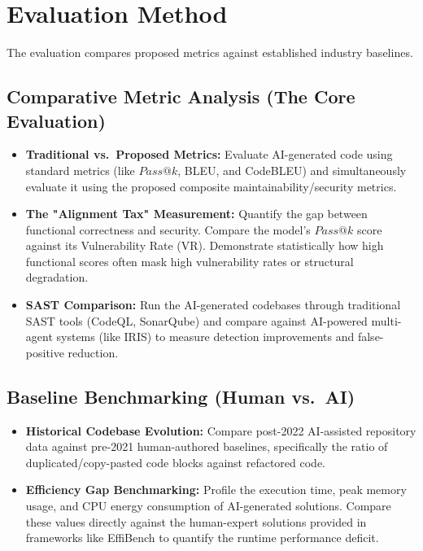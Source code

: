 \section{Evaluation Method}
The evaluation compares proposed metrics against established industry baselines.

\subsection{Comparative Metric Analysis (The Core Evaluation)}
\begin{itemize}
    \item \textbf{Traditional vs.\ Proposed Metrics:} Evaluate AI-generated code using standard metrics (like $Pass@k$, BLEU, and CodeBLEU) and simultaneously evaluate it using the proposed composite maintainability/security metrics.
    \item \textbf{The "Alignment Tax" Measurement:} Quantify the gap between functional correctness and security. Compare the model's $Pass@k$ score against its Vulnerability Rate (VR). Demonstrate statistically how high functional scores often mask high vulnerability rates or structural degradation.
    \item \textbf{SAST Comparison:} Run the AI-generated codebases through traditional SAST tools (CodeQL, SonarQube) and compare against AI-powered multi-agent systems (like IRIS) to measure detection improvements and false-positive reduction.
\end{itemize}

\subsection{Baseline Benchmarking (Human vs.\ AI)}
\begin{itemize}
    \item \textbf{Historical Codebase Evolution:} Compare post-2022 AI-assisted repository data against pre-2021 human-authored baselines, specifically the ratio of duplicated/copy-pasted code blocks against refactored code.
    \item \textbf{Efficiency Gap Benchmarking:} Profile the execution time, peak memory usage, and CPU energy consumption of AI-generated solutions. Compare these values directly against the human-expert solutions provided in frameworks like EffiBench to quantify the runtime performance deficit.
\end{itemize}

